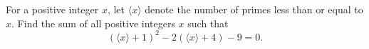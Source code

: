 For a positive integer $x$, let $\langle x\rangle$ denote the number of primes less than or equal to $x$. Find the sum of all positive integers $x$ such that
\[
\left(\langle x\rangle+1\right)^2-2\left(\langle x\rangle+4\right)-9=0 .
\]
